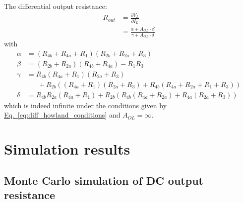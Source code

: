 \documentclass[10pt]{article}
\newcommand{\briefeqlink}[1]{\hyperref[#1]{Eq.~\ref*{#1}}\xspace }
\begin{document}
The differential output resistance:
\begin{align}
\label{eq:rout_diff}
R_{out} &= \frac{\partial V_L}{\partial{}I_L}\nonumber\\
&= \frac{\alpha + A_{OL}\cdot\beta}{\gamma + A_{OL}\cdot\delta}
\end{align}
with
\begin{align}
\alpha &= (R_{4b} + R_{4a} + R_1) (R_{2b} + R_{2a} + R_3)\nonumber\\
\beta &= (R_{2b} + R_{2a})(R_{4b} + R_{4a}) - R_1 R_3\nonumber\\
\gamma &= R_{4b} (R_{4a} + R_1) (R_{2a} + R_3)\nonumber\\
&\ \ \ \ \ \ \ + R_{2b} ((R_{4a} + R_1) (R_{2a} + R_3) + R_{4b} (R_{4a} + R_{2a} + R_1 + R_3))\nonumber\\
\delta &= R_{4b} R_{2a} (R_{4a} + R_1) + R_{2b} (R_{4b} (R_{4a} + R_{2a}) + R_{4a} (R_{2a} + R_3))\nonumber
\end{align}
which is indeed infinite under the conditions given by \briefeqlink{eq:diff_howland_conditions} and $A_{OL}=\infty$.




\section{Simulation results}
\label{sec:sim_results}

\subsection{Monte Carlo simulation of DC output resistance}
\label{sec:monte_carlo}
\end{document}
